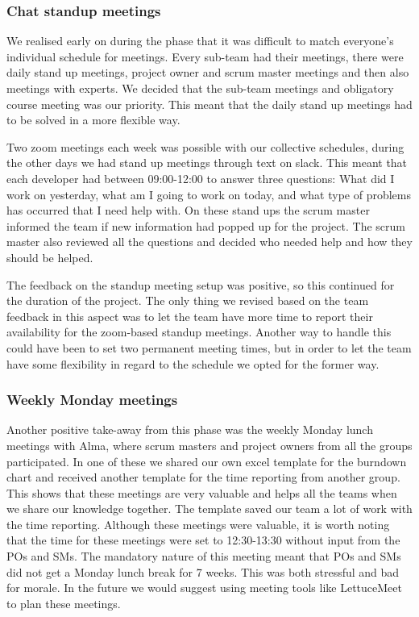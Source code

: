 \documentclass{article}
\begin{document}
\subsubsection{Chat standup meetings}
We realised early on during the phase that it was difficult to match everyone's individual schedule for meetings. Every sub-team had their meetings, there were daily stand up meetings, project owner and scrum master meetings and then also meetings with experts. We decided that the sub-team meetings and obligatory course meeting was our priority. This meant that the daily stand up meetings had to be solved in a more flexible way. 

Two zoom meetings each week was possible with our collective schedules, during the other days we had stand up meetings through text on slack. This meant that each developer had between 09:00-12:00 to answer three questions: What did I work on yesterday, what am I going to work on today, and what type of problems has occurred that I need help with. On these stand ups the scrum master informed the team if new information had popped up for the project. The scrum master also reviewed all the questions and decided who needed help and how they should be helped. 

The feedback on the standup meeting setup was positive, so this continued for the duration of the project. The only thing we revised based on the team feedback in this aspect was to let the team have more time to report their availability for the zoom-based standup meetings. Another way to handle this could have been to set two permanent meeting times, but in order to let the team have some flexibility in regard to the schedule we opted for the former way. 

\subsubsection{Weekly Monday meetings}
Another positive take-away from this phase was the weekly Monday lunch meetings with Alma, where scrum masters and project owners from all the groups participated. In one of these we shared our own excel template for the burndown chart and received another template for the time reporting from another group. This shows that these meetings are very valuable and helps all the teams when we share our knowledge together. The template saved our team a lot of work with the time reporting. Although these meetings were valuable, it is worth noting that the time for these meetings were set to 12:30-13:30 without input from the POs and SMs. The mandatory nature of this meeting meant that POs and SMs did not get a Monday lunch break for 7 weeks. This was both stressful and bad for morale. In the future we would suggest using meeting tools like LettuceMeet to plan these meetings.
\end{document}
